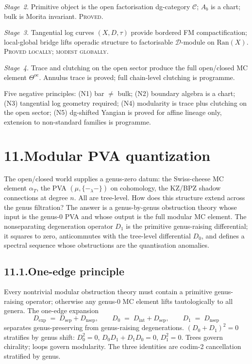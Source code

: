 \documentclass[11pt,reqno]{amsart}
\theoremstyle{definition}
\theoremstyle{remark}
\providecommand{\cC}{\mathcal{C}}
\providecommand{\cD}{\mathcal{D}}
\providecommand{\Ran}{\mathrm{Ran}}
\providecommand{\oc}{\mathrm{oc}}
\providecommand{\sep}{\mathrm{sep}}
\providecommand{\nsep}{\mathrm{nsep}}
\numberwithin{equation}{section}
\begin{document}
\emph{Stage~2.} Primitive object is the open factorisation
dg-category $\cC$; $A_b$ is a chart; bulk is Morita invariant.
\textsc{Proved.}

\emph{Stage~3.} Tangential log curves $(X, D, \tau)$ provide
bordered FM compactification; local-global bridge lifts
operadic structure to factorisable $\cD$-module on $\Ran(X)$.
\textsc{Proved locally; modest globally.}

\emph{Stage~4.} Trace and clutching on the open sector produce
the full open/closed MC element $\Theta^{\oc}$. Annulus trace
is proved; full chain-level clutching is programme.

Five negative principles: (N1) bar $\neq$ bulk; (N2) boundary
algebra is a chart; (N3) tangential log geometry required;
(N4) modularity is trace plus clutching on the open sector;
(N5) dg-shifted Yangian is proved for affine lineage only,
extension to non-standard families is programme.


\section*{11.\quad Modular PVA quantization}

The open/closed world supplies a genus-zero datum: the
Swiss-cheese MC element $\alpha_T$, the PVA
$(\mu, \{-_\lambda -\})$ on cohomology, the KZ/BPZ shadow
connections at degree $n$. All are tree-level. How does this
structure extend across the genus filtration? The answer is
a genus-by-genus obstruction theory whose input is the genus-$0$
PVA and whose output is the full modular MC element. The
nonseparating degeneration operator $D_1$ is the primitive
genus-raising differential; it squares to zero, anticommutes
with the tree-level differential $D_0$, and defines a spectral
sequence whose obstructions are the quantisation anomalies.

\subsection*{11.1.\enspace One-edge principle}

Every nontrivial modular obstruction theory must contain a
primitive genus-raising operator; otherwise any genus-$0$ MC
element lifts tautologically to all genera. The one-edge
expansion
\[
D_{\exp} \;=\; D_{\sep} + D_{\nsep},
\qquad
D_0 \;=\; D_{\mathrm{int}} + D_{\sep},
\qquad
D_1 \;=\; D_{\nsep}
\]
separates genus-preserving from genus-raising degenerations.
$(D_0 + D_1)^2 = 0$ stratifies by genus shift:
$D_0^2 = 0$, $D_0 D_1 + D_1 D_0 = 0$, $D_1^2 = 0$. Trees
govern chirality; loops govern modularity. The three
identities are codim-2 cancellation stratified by genus.
\end{document}
